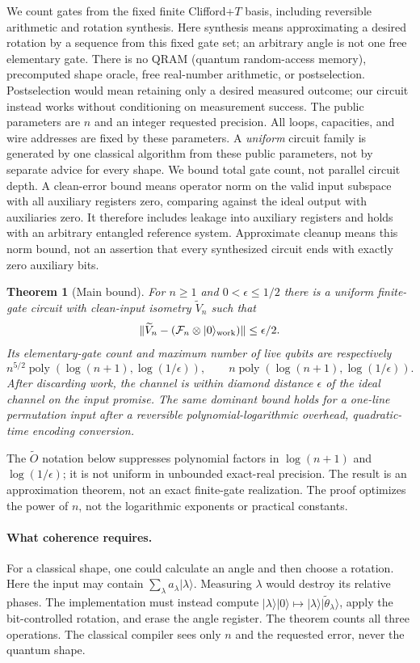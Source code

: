 \documentclass[11pt]{article}
\newtheorem{theorem}{Theorem}
\theoremstyle{definition}
\newcommand{\ket}[1]{\lvert #1\rangle}
\newcommand{\norm}[1]{\lVert #1\rVert}
\newcommand{\F}{\mathcal F}
\newcommand{\poly}{\operatorname{poly}}
\begin{document}
We count gates from the fixed finite Clifford+$T$ basis,
including reversible arithmetic and rotation synthesis. Here synthesis
means approximating a desired rotation by a sequence from this fixed
gate set; an arbitrary angle is not one free elementary gate.
There is no QRAM (quantum random-access memory),
precomputed shape oracle, free real-number arithmetic, or postselection.
Postselection would mean retaining only a desired measured outcome;
our circuit instead works without conditioning on measurement success.
The public parameters are $n$ and an integer requested precision. All loops,
capacities, and wire addresses are fixed by these parameters. A
\emph{uniform} circuit family is generated by one classical algorithm
from these public parameters, not by separate advice for every shape.
We bound total gate count, not parallel circuit depth. A clean-error
bound means operator norm on the valid input subspace with all auxiliary
registers zero, comparing against the ideal output with auxiliaries zero.
It therefore includes leakage into auxiliary registers and holds with an
arbitrary entangled reference system. Approximate cleanup means this norm
bound, not an assertion that every synthesized circuit ends with exactly
zero auxiliary bits.

\begin{theorem}[Main bound]\label{thm:main}
For $n\ge1$ and $0<\epsilon\le1/2$ there is a uniform finite-gate circuit
with clean-input isometry $\widetilde V_n$ such that
\[
 \norm{\widetilde V_n-(\F_n\otimes\ket0_{\rm work})}\le\epsilon/2.
\]
Its elementary-gate count and maximum number of live qubits are respectively
\[
 n^{5/2}\poly(\log(n+1),\log(1/\epsilon)),\qquad
 n\poly(\log(n+1),\log(1/\epsilon)).
\]
After discarding work, the channel is within diamond distance $\epsilon$
of the ideal channel on the input promise. The same dominant bound holds
for a one-line permutation input after a reversible polynomial-logarithmic
overhead, quadratic-time encoding conversion.
\end{theorem}

The $\widetilde O$ notation below suppresses polynomial factors in
$\log(n+1)$ and $\log(1/\epsilon)$; it is not uniform in unbounded exact-real
precision. The result is an approximation theorem, not an exact finite-gate
realization. The proof optimizes the power of $n$, not the logarithmic
exponents or practical constants.

\paragraph{What coherence requires.}
For a classical shape, one could calculate an angle and then choose a
rotation. Here the input may contain $\sum_\lambda a_\lambda\ket\lambda$.
Measuring $\lambda$ would destroy its relative phases. The implementation
must instead compute
$\ket\lambda\ket0\mapsto\ket\lambda\ket{\widetilde\theta_\lambda}$,
apply the bit-controlled rotation, and erase the angle register.
The theorem counts all three operations. The classical compiler sees only
$n$ and the requested error, never the quantum shape.
\end{document}
